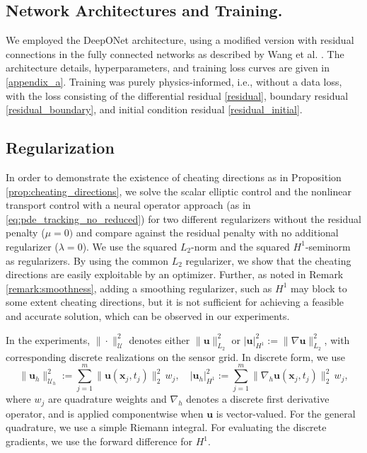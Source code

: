 \documentclass[final,1p,times]{elsarticle}
\theoremstyle{plain} %
\theoremstyle{definition} %
\theoremstyle{remark} %
\begin{document}
\subsection{Network Architectures and Training.}
We employed the DeepONet architecture, using a modified version with residual connections in the fully connected networks as described by Wang et al. \cite{wang2021understanding}. The architecture details, hyperparameters, and training loss curves are given in \ref{appendix_a}. Training was purely physics-informed, i.e., without a data loss, with the loss consisting of the differential residual \eqref{residual}, boundary residual \eqref{residual_boundary}, and initial condition residual \eqref{residual_initial}.

\subsection{Regularization}
In order to demonstrate the existence of cheating directions as in Proposition \ref{prop:cheating_directions}, we solve the scalar elliptic control and the nonlinear transport control with a neural operator approach (as in \eqref{eq:pde_tracking_no_reduced}) for two different regularizers without the residual penalty ($\mu=0)$ and compare against the residual penalty with no additional regularizer ($\lambda=0$). We use the squared $L_2$-norm and the squared $H^1$-seminorm as regularizers. By using the common $L_2$ regularizer, we show that the cheating directions are easily exploitable by an optimizer. Further, as noted in Remark \ref{remark:smoothness}, adding a smoothing regularizer, such as $H^1$ may block to some extent cheating directions, but it is not sufficient for achieving a feasible and accurate solution, which can be observed in our experiments.

In the experiments, $\|\cdot\|_{\mathcal U}^2$ denotes either
$\|\mathbf{u}\|_{L_2}^2$ or $|\mathbf{u}|_{H^1}^2:=\|\nabla \mathbf{u}\|_{L_2}^2$,
with corresponding discrete realizations on the sensor grid. In discrete form, we use
\begin{equation}
\|\mathbf{u}_h\|_{\mathcal{U}_h}^2 := \sum_{j=1}^{m} \|\mathbf{u}(\mathbf{x}_j,t_j)\|_2^2\,w_j,
\quad
|\mathbf{u}_h|_{H^1}^2 := \sum_{j=1}^{m} \|\nabla_h \mathbf{u}(\mathbf{x}_j,t_j)\|_2^2\,w_j,
\end{equation}
where $w_j$ are quadrature weights and $\nabla_h$ denotes a discrete first derivative operator, and is applied componentwise when $\mathbf{u}$ is vector-valued. For the general quadrature, we use a simple Riemann integral. For evaluating the discrete gradients, we use the forward difference for $H^1$.
\end{document}
